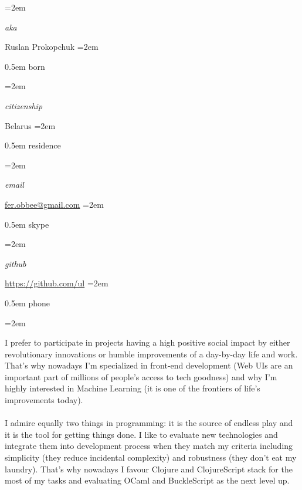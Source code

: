 \documentclass{scrartcl}
\newlength{\datebox}\settowidth{\datebox}{Spring 2011} %
\newcommand{\NewEntry}[3]{\noindent\hangindent=2em\hangafter=0 \parbox{\datebox}{\small \textit{#1}}\hspace{1.5em} #2 #3 %
\vspace{0.5em}} %
\newcommand{\Description}[1]{\hangindent=2em\hangafter=0\noindent\raggedright\footnotesize{#1}\par\normalsize\vspace{1em}} %
\begin{document}
\thispagestyle{empty} %


\begin{cv}{}\vspace{1.5em} %

\noindent{}\vspace{0.5em} %

\NewEntry{aka}{Ruslan Prokopchuk}

\NewEntry{born}{18 April 1988} %

\NewEntry{citizenship}{Belarus} %

\NewEntry{residence}{Odessa, Ukraine} %

\NewEntry{email}{\href{mailto:fer.obbee@gmail.com}{fer.obbee@gmail.com}} %

\NewEntry{skype}{ruslan.prokopchuk} %

\NewEntry{github}{\href{https://github.com/ul}{https://github.com/ul}} %

\NewEntry{phone}{+380 (50) 676 63 80} %

\vspace{1em} %

\noindent{}\vspace{1em} %

\Description{I prefer to participate in projects having a high positive social impact by either revolutionary innovations or humble improvements of a day-by-day life and work. That's why nowadays I'm specialized in front-end development (Web UIs are an important part of millions of people's access to tech goodness)  and why I'm highly interested in Machine Learning (it is one of the frontiers of life's improvements today).
\\\ \\
I admire equally two things in programming: it is the source of endless play and
it is the tool for getting things done. I like to evaluate new technologies and
integrate them into development process when they match my criteria including
simplicity (they reduce incidental complexity) and robustness (they don't eat my
laundry).  That's why nowadays I favour Clojure and ClojureScript stack for the
most of my tasks and evaluating OCaml and BuckleScript as the next level up.}\vspace{2em} %


\end{cv}
\end{document}
